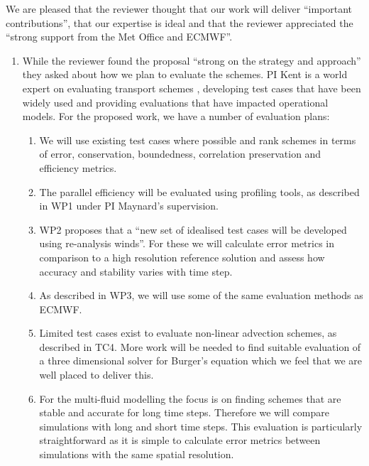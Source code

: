 We are pleased that the reviewer thought that our work will deliver ``important contributions'', that our expertise is ideal and that the reviewer appreciated the ``strong support from the Met Office and ECMWF''. 

\begin{enumerate}
\item While the reviewer found the proposal ``strong on the strategy and approach'' they asked about how we plan to evaluate the schemes. PI Kent is a world expert on evaluating transport schemes \cite[]{KENT2014b,KENT2014c,KENT2012a,KENTHOLDAWAY,KENT2014a,DCMIP2016}, developing test cases that have been widely used and providing evaluations that have impacted operational models. For the proposed work, we have a number of evaluation plans:
    \begin{enumerate}
    \item We will use existing test cases where possible and rank schemes in terms of error, conservation, boundedness, correlation preservation and efficiency metrics. 
    \item The parallel efficiency will be evaluated using profiling tools, as described in WP1 under PI Maynard's supervision.
    \item WP2 proposes that a ``new set of idealised test cases will be developed using re-analysis winds''. For these we will calculate error metrics in comparison to a high resolution reference solution and assess how accuracy and stability varies with time step.
    \item As described in WP3, we will use some of the same evaluation methods as ECMWF.
    \item Limited test cases exist to evaluate non-linear advection schemes, as described in TC4. More work will be needed to find suitable evaluation of a three dimensional solver for Burger's equation which we feel that we are well placed to deliver this.
    \item For the multi-fluid modelling the focus is on finding schemes that are stable and accurate for long time steps. Therefore we will compare simulations with long and short time steps. This evaluation is particularly straightforward as it is simple to calculate error metrics between simulations with the same spatial resolution. 
    \end{enumerate}


\end{enumerate}
